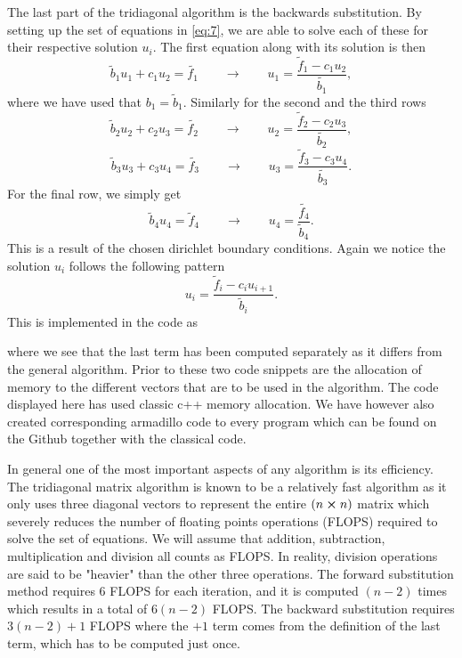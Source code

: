 \documentclass[a4paper,10pt]{article}
\begin{document}
The last part of the tridiagonal algorithm is the backwards substitution. By setting up the set of equations in \eqref{eq:7}, we are able to solve each of these for their respective solution $u_i$. The first equation along with its solution is then
\[
\tilde{b}_1 u_1 + c_1 u_2 = \tilde{f_1} \qquad \rightarrow \qquad u_1 = \frac{\tilde{f}_1 - c_1 u_2}{\tilde{b_1}},
\]
where we have used that $b_1 = \tilde{b}_1$. Similarly for the second and the third rows
\[
\tilde{b}_2 u_2 + c_2 u_3 = \tilde{f_2} \qquad \rightarrow \qquad u_2 = \frac{\tilde{f}_2 - c_2 u_3}{\tilde{b_2}},
\]
\[
\tilde{b}_3 u_3 + c_3 u_4 = \tilde{f_3} \qquad \rightarrow \qquad u_3 = \frac{\tilde{f}_3 - c_3 u_4}{\tilde{b_3}}.
\]
For the final row, we simply get
\[
\tilde{b}_4 u_4 = \tilde{f}_4 \qquad \rightarrow \qquad u_4 = \frac{\tilde{f_4}}{\tilde{b}_4}.
\]
This is a result of the chosen dirichlet boundary conditions. Again we notice the solution $u_i$ follows the following pattern
\begin{equation}\label{eq:9}
u_i = \frac{\tilde{f}_i - c_i u_{i+1}}{\tilde{b}_i}.
\end{equation}
\newpage
This is implemented in the code as

where we see that the last term has been computed separately as it differs from the general algorithm. Prior to these two code snippets are the allocation of memory to the different vectors that are to be used in the algorithm. The code displayed here has used classic c++ memory allocation. We have however also created corresponding armadillo code to every program which can be found on the Github together with the classical code.

In general one of the most important aspects of any algorithm is its efficiency. The tridiagonal matrix algorithm is known to be a relatively fast algorithm as it only uses three diagonal vectors to represent the entire $(n \cross n)$ matrix which severely reduces the number of floating points operations (FLOPS) required to solve the set of equations. We will assume that addition, subtraction, multiplication and division all counts as FLOPS. In reality, division operations are said to be "heavier" than the other three operations. The forward substitution method requires 6 FLOPS for each iteration, and it is computed $(n-2)$ times which results in a total of $6(n-2)$ FLOPS. The backward substitution requires $3(n-2) +1 $ FLOPS where the $+1$ term comes from the definition of the last term, which has to be computed just once.
\end{document}
